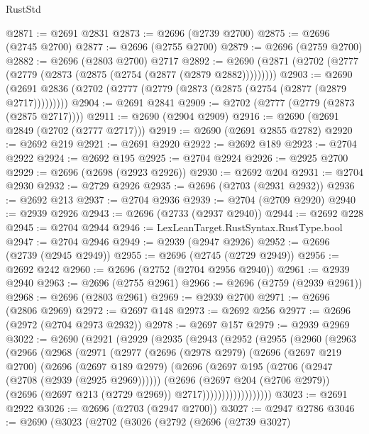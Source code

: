 \begin{lexlean}{RustStd}
\begin{coremodule}
@2871 := @2691 @2831
@2873 := @2696 (@2739 @2700)
@2875 := @2696 (@2745 @2700)
@2877 := @2696 (@2755 @2700)
@2879 := @2696 (@2759 @2700)
@2882 := @2696 (@2803 @2700) @2717
@2892 := @2690 (@2871 (@2702 (@2777 (@2779 (@2873 (@2875 (@2754 (@2877 (@2879 @2882)))))))))
@2903 := @2690 (@2691 @2836 (@2702 (@2777 (@2779 (@2873 (@2875 (@2754 (@2877 (@2879 @2717)))))))))
@2904 := @2691 @2841
@2909 := @2702 (@2777 (@2779 (@2873 (@2875 @2717))))
@2911 := @2690 (@2904 @2909)
@2916 := @2690 (@2691 @2849 (@2702 (@2777 @2717)))
@2919 := @2690 (@2691 @2855 @2782)
@2920 := @2692 @219
@2921 := @2691 @2920
@2922 := @2692 @189
@2923 := @2704 @2922
@2924 := @2692 @195
@2925 := @2704 @2924
@2926 := @2925 @2700
@2929 := @2696 (@2698 (@2923 @2926))
@2930 := @2692 @204
@2931 := @2704 @2930
@2932 := @2729 @2926
@2935 := @2696 (@2703 (@2931 @2932))
@2936 := @2692 @213
@2937 := @2704 @2936
@2939 := @2704 (@2709 @2920)
@2940 := @2939 @2926
@2943 := @2696 (@2733 (@2937 @2940))
@2944 := @2692 @228
@2945 := @2704 @2944
@2946 := LexLeanTarget.RustSyntax.RustType.bool
@2947 := @2704 @2946
@2949 := @2939 (@2947 @2926)
@2952 := @2696 (@2739 (@2945 @2949))
@2955 := @2696 (@2745 (@2729 @2949))
@2956 := @2692 @242
@2960 := @2696 (@2752 (@2704 @2956 @2940))
@2961 := @2939 @2940
@2963 := @2696 (@2755 @2961)
@2966 := @2696 (@2759 (@2939 @2961))
@2968 := @2696 (@2803 @2961)
@2969 := @2939 @2700
@2971 := @2696 (@2806 @2969)
@2972 := @2697 @148
@2973 := @2692 @256
@2977 := @2696 (@2972 (@2704 @2973 @2932))
@2978 := @2697 @157
@2979 := @2939 @2969
@3022 := @2690
    (@2921
      (@2929
        (@2935
          (@2943
            (@2952
              (@2955
                (@2960
                  (@2963
                    (@2966
                      (@2968
                        (@2971
                          (@2977
                            (@2696
                              (@2978 @2979)
                              (@2696
                                (@2697 @219 @2700)
                                (@2696
                                  (@2697 @189 @2979)
                                  (@2696
                                    (@2697 @195 (@2706 (@2947 (@2708 (@2939 (@2925 @2969))))))
                                    (@2696
                                      (@2697 @204 (@2706 @2979))
                                      (@2696 (@2697 @213 (@2729 @2969)) @2717))))))))))))))))))
@3023 := @2691 @2922
@3026 := @2696 (@2703 (@2947 @2700))
@3027 := @2947 @2786
@3046 := @2690
    (@3023
      (@2702
        (@3026
          (@2792
            (@2696
              (@2739 @3027)

\end{coremodule}
\end{lexlean}

